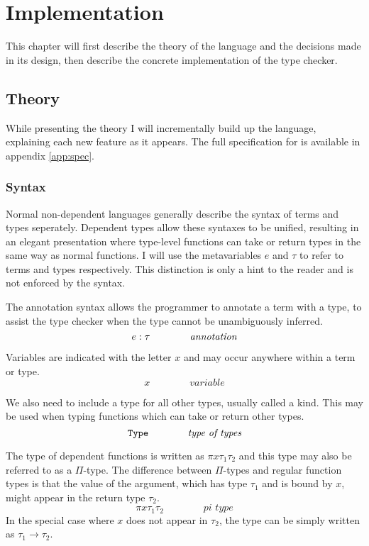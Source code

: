 \documentclass[12pt,a4paper,twoside]{report}
\begin{document}
\chapter{Implementation}

This chapter will first describe the theory of the language and the decisions made in its design, then describe the concrete implementation of the type checker.

\section{Theory}

While presenting the theory I will incrementally build up the language, explaining each new feature as it appears.
The full specification for \pimu{} is available in appendix \ref{app:spec}.

\subsection{Syntax}

Normal non-dependent languages generally describe the syntax of terms and types seperately.
Dependent types allow these syntaxes to be unified, resulting in an elegant presentation where type-level functions can take or return types in the same way as normal functions.
I will use the metavariables \(e\) and \(\tau\) to refer to terms and types respectively.
This distinction is only a hint to the reader and is not enforced by the syntax.

The annotation syntax allows the programmer to annotate a term with a type, to assist the type checker when the type cannot be unambiguously inferred.
\[
    e : \tau \qquad\qquad \textit{annotation}
\]

Variables are indicated with the letter \(x\) and may occur anywhere within a term or type.
\[
    x \qquad\qquad \textit{variable}
\]

We also need to include a type for all other types, usually called a kind.
This may be used when typing functions which can take or return other types.
\[
    \mathtt{Type}{} \qquad\qquad \textit{type of types}
\]

The type of dependent functions is written as \(\pi{x}{\tau_1}{\tau_2}\) and this type may also be referred to as a \(\Pi\)-type.
The difference between \(\Pi\)-types and regular function types is that the value of the argument, which has type \(\tau_1\) and is bound by \(x\), might appear in the return type \(\tau_2\).
\[
    \pi{x}{\tau_1}{\tau_2} \qquad\qquad \textit{pi type}
\]
In the special case where \(x\) does not appear in \(\tau_2\), the type can be simply written as \(\tau_1 \rightarrow \tau_2\).
\end{document}
